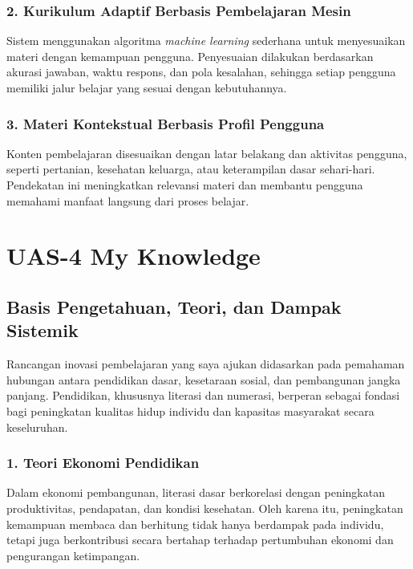 \documentclass[
  letterpaper,
  DIV=11,
  numbers=noendperiod]{scrreprt}
\begin{document}
\subsection{2. Kurikulum Adaptif Berbasis Pembelajaran
Mesin}\label{kurikulum-adaptif-berbasis-pembelajaran-mesin}

Sistem menggunakan algoritma \emph{machine learning} sederhana untuk
menyesuaikan materi dengan kemampuan pengguna. Penyesuaian dilakukan
berdasarkan akurasi jawaban, waktu respons, dan pola kesalahan, sehingga
setiap pengguna memiliki jalur belajar yang sesuai dengan kebutuhannya.

\subsection{3. Materi Kontekstual Berbasis Profil
Pengguna}\label{materi-kontekstual-berbasis-profil-pengguna}

Konten pembelajaran disesuaikan dengan latar belakang dan aktivitas
pengguna, seperti pertanian, kesehatan keluarga, atau keterampilan dasar
sehari-hari. Pendekatan ini meningkatkan relevansi materi dan membantu
pengguna memahami manfaat langsung dari proses belajar.


\chapter{UAS-4 My Knowledge}\label{uas-4-my-knowledge}

\section{Basis Pengetahuan, Teori, dan Dampak
Sistemik}\label{basis-pengetahuan-teori-dan-dampak-sistemik}

Rancangan inovasi pembelajaran yang saya ajukan didasarkan pada
pemahaman hubungan antara pendidikan dasar, kesetaraan sosial, dan
pembangunan jangka panjang. Pendidikan, khususnya literasi dan numerasi,
berperan sebagai fondasi bagi peningkatan kualitas hidup individu dan
kapasitas masyarakat secara keseluruhan.

\subsection{1. Teori Ekonomi Pendidikan}\label{teori-ekonomi-pendidikan}

Dalam ekonomi pembangunan, literasi dasar berkorelasi dengan peningkatan
produktivitas, pendapatan, dan kondisi kesehatan. Oleh karena itu,
peningkatan kemampuan membaca dan berhitung tidak hanya berdampak pada
individu, tetapi juga berkontribusi secara bertahap terhadap pertumbuhan
ekonomi dan pengurangan ketimpangan.
\end{document}
